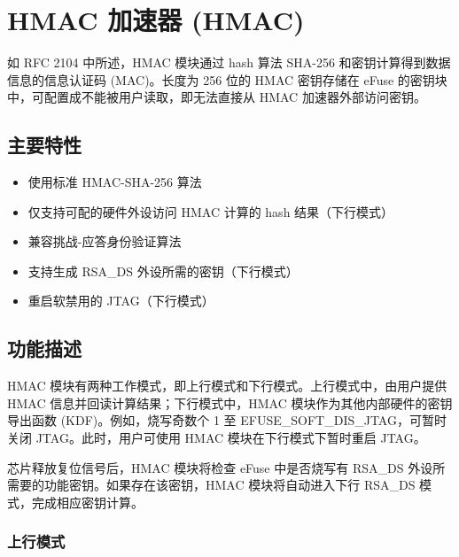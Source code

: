 \documentclass[main\_\_CN.tex]{subfiles}
\begin{document}

\ifglobal
\else
    {\let\clearpage\relax \listoftodos}
    \tableofcontents
\fi




\chapter{HMAC 加速器 (HMAC)}
\label{mod:hmac}
\hypertarget{hmac}{}

如 RFC 2104 中所述，HMAC 模块通过 hash 算法 SHA-256 和密钥计算得到数据信息的信息认证码 (MAC)。长度为 256 位的 HMAC 密钥存储在 eFuse 的密钥块中，可配置成不能被用户读取，即无法直接从 HMAC 加速器外部访问密钥。

\section{主要特性}
\begin{itemize}
    \item 使用标准 HMAC-SHA-256 算法
    \item 仅支持可配的硬件外设访问 HMAC 计算的 hash 结果（下行模式）
    \item 兼容挑战-应答身份验证算法
    \item 支持生成 RSA\_DS 外设所需的密钥（下行模式）
    \item 重启软禁用的 JTAG（下行模式）
\end{itemize}


\section{功能描述}
HMAC 模块有两种工作模式，即上行模式和下行模式。上行模式中，由用户提供 HMAC 信息并回读计算结果；下行模式中，HMAC 模块作为其他内部硬件的密钥导出函数 (KDF)。例如，烧写奇数个 1 至 EFUSE\_SOFT\_DIS\_JTAG，可暂时关闭 JTAG。此时，用户可使用 HMAC 模块在下行模式下暂时重启 JTAG。

芯片释放复位信号后，HMAC 模块将检查 eFuse 中是否烧写有 RSA\_DS 外设所需要的功能密钥。如果存在该密钥，HMAC 模块将自动进入下行 RSA\_DS 模式，完成相应密钥计算。

\subsection{上行模式}
\end{document}
